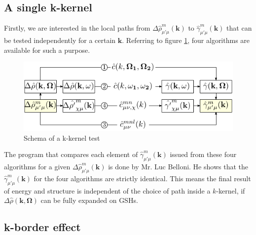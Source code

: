 \subsection{A single k-kernel\label{subsec:A-single-k-kernel}}

Firstly, we are interested in the local paths from $\Delta\hat{\rho}_{\mu'\mu}^{m}(\mathbf{k})$
to $\hat{\gamma}_{\mu'\mu}^{m}(\mathbf{k})$ that can be tested
independently for a certain $\mathbf{k}$. Referring to figure \ref{fig:k-kernel},
four algorithms are available for such a purpose.

\begin{figure}[h]
\begin{centering}
\includegraphics{_figure/algorithms_q}
\par\end{centering}
\caption{Schema of a k-kernel test \label{fig:k-kernel} }
\end{figure}

The program that compares each element of $\hat{\gamma}_{\mu'\mu}^{m}(\mathbf{k})$
issued from these four algorithms for a given $\Delta\hat{\rho}_{\mu'\mu}^{m}(\mathbf{k})$
is done by Mr. Luc Belloni. He shows that the $\hat{\gamma}_{\mu'\mu}^{m}(\mathbf{k})$
for the four algorithms are strictly identical. This means the final
result of energy and structure is independent of the choice of path
inside a $k$-kernel, if $\Delta\hat{\rho}(\mathbf{k},\mathbf{\Omega})$
can be fully expanded on \acs{GSH}s.

\subsection{k-border effect\label{subsec:k-border-effect}}

